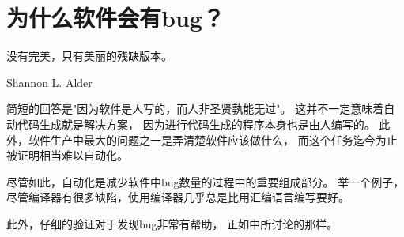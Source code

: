 
\section{为什么软件会有bug？}
\label{sec:app:questions:Why Is Software Buggy?}
%
\epigraph{没有完美，只有美丽的残缺版本。}
	 {Shannon L. Alder}

简短的回答是"因为软件是人写的，而人非圣贤孰能无过"。
这并不一定意味着自动代码生成就是解决方案，
因为进行代码生成的程序本身也是由人编写的。
此外，软件生产中最大的问题之一是弄清楚软件应该做什么，
而这个任务迄今为止被证明相当难以自动化。

尽管如此，自动化是减少软件中bug数量的过程中的重要组成部分。
举一个例子，尽管编译器有很多缺陷，使用编译器几乎总是比用汇编语言编写要好。

此外，仔细的验证对于发现bug非常有帮助，
正如中所讨论的那样。
